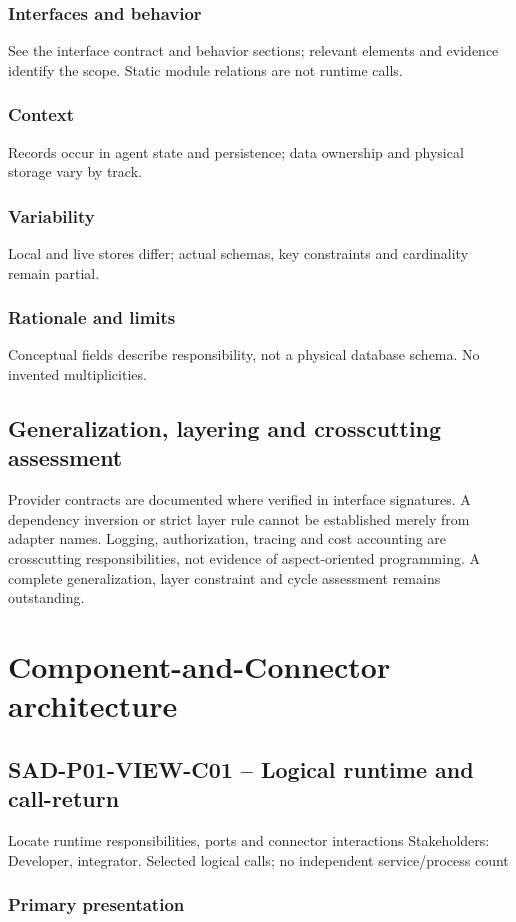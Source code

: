 \documentclass[10pt,letterpaper]{article}
\begin{document}
\subsubsection{Interfaces and behavior}
See the interface contract and behavior sections; relevant elements and evidence identify the scope. Static module relations are not runtime calls.
\subsubsection{Context}
Records occur in agent state and persistence; data ownership and physical storage vary by track.
\subsubsection{Variability}
Local and live stores differ; actual schemas, key constraints and cardinality remain partial.
\subsubsection{Rationale and limits}
Conceptual fields describe responsibility, not a physical database schema. No invented multiplicities.

\subsection{Generalization, layering and crosscutting assessment}
Provider contracts are documented where verified in interface signatures. A dependency inversion or strict layer rule cannot be established merely from adapter names. Logging, authorization, tracing and cost accounting are crosscutting responsibilities, not evidence of aspect-oriented programming. A complete generalization, layer constraint and cycle assessment remains outstanding.
\section{Component-and-Connector architecture}
\subsection{SAD-P01-VIEW-C01 -- Logical runtime and call-return}
Locate runtime responsibilities, ports and connector interactions Stakeholders: Developer, integrator. Selected logical calls; no independent service/process count
\subsubsection{Primary presentation}
\end{document}
